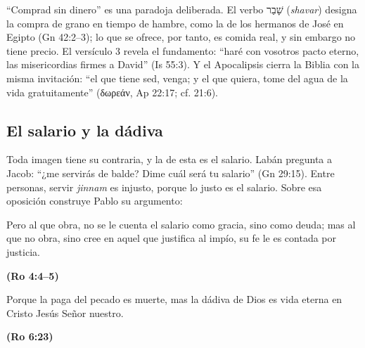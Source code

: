 \documentclass[11pt,letterpaper]{article}
\newcommand{\heb}[1]{\mbox{\foreignlanguage{hebrew}{#1}}}
\newcommand{\grc}[1]{\foreignlanguage{ancientgreek}{#1}}
\newcommand{\fuente}[1]{\par\hfill{\upshape\bfseries\small\textcolor{azul}{#1}}}
\begin{document}
``Comprad sin dinero'' es una paradoja deliberada. El verbo \heb{שָׁבַר} (\emph{shavar}) designa la compra de grano en tiempo de hambre, como la de los hermanos de José en Egipto (Gn 42:2--3); lo que se ofrece, por tanto, es comida real, y sin embargo no tiene precio. El versículo 3 revela el fundamento: ``haré con vosotros pacto eterno, las misericordias firmes a David'' (Is 55:3). Y el Apocalipsis cierra la Biblia con la misma invitación: ``el que tiene sed, venga; y el que quiera, tome del agua de la vida gratuitamente'' (\grc{δωρεάν}, Ap 22:17; cf. 21:6).

\subsection{El salario y la dádiva}
Toda imagen tiene su contraria, y la de esta es el salario. Labán pregunta a Jacob: ``¿me servirás de balde? Dime cuál será tu salario'' (Gn 29:15). Entre personas, servir \emph{jinnam} es injusto, porque lo justo es el salario. Sobre esa oposición construye Pablo su argumento:

\begin{cita}Pero al que obra, no se le cuenta el salario como gracia, sino como deuda; mas al que no obra, sino cree en aquel que justifica al impío, su fe le es contada por justicia.\fuente{(Ro 4:4--5)}\end{cita}

\begin{cita}Porque la paga del pecado es muerte, mas la dádiva de Dios es vida eterna en Cristo Jesús Señor nuestro.\fuente{(Ro 6:23)}\end{cita}
\end{document}
